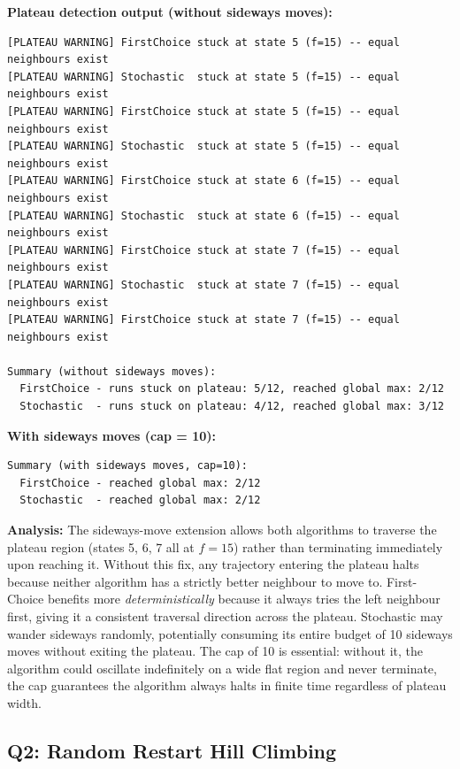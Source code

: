 \documentclass[12pt,a4paper]{article}
\begin{document}
\textbf{Plateau detection output (without sideways moves):}

\begin{lstlisting}[style=output]
[PLATEAU WARNING] FirstChoice stuck at state 5 (f=15) -- equal neighbours exist
[PLATEAU WARNING] Stochastic  stuck at state 5 (f=15) -- equal neighbours exist
[PLATEAU WARNING] FirstChoice stuck at state 5 (f=15) -- equal neighbours exist
[PLATEAU WARNING] Stochastic  stuck at state 5 (f=15) -- equal neighbours exist
[PLATEAU WARNING] FirstChoice stuck at state 6 (f=15) -- equal neighbours exist
[PLATEAU WARNING] Stochastic  stuck at state 6 (f=15) -- equal neighbours exist
[PLATEAU WARNING] FirstChoice stuck at state 7 (f=15) -- equal neighbours exist
[PLATEAU WARNING] Stochastic  stuck at state 7 (f=15) -- equal neighbours exist
[PLATEAU WARNING] FirstChoice stuck at state 7 (f=15) -- equal neighbours exist

Summary (without sideways moves):
  FirstChoice - runs stuck on plateau: 5/12, reached global max: 2/12
  Stochastic  - runs stuck on plateau: 4/12, reached global max: 3/12
\end{lstlisting}

\textbf{With sideways moves (cap = 10):}

\begin{lstlisting}[style=output]
Summary (with sideways moves, cap=10):
  FirstChoice - reached global max: 2/12
  Stochastic  - reached global max: 2/12
\end{lstlisting}

\textbf{Analysis:}
The sideways-move extension allows both algorithms to traverse the plateau
region (states 5, 6, 7 all at $f=15$) rather than terminating immediately upon
reaching it. Without this fix, any trajectory entering the plateau halts because
neither algorithm has a strictly better neighbour to move to.
First-Choice benefits more \emph{deterministically} because it always tries the
left neighbour first, giving it a consistent traversal direction across the plateau.
Stochastic may wander sideways randomly, potentially consuming its entire budget
of 10 sideways moves without exiting the plateau.
The cap of 10 is essential: without it, the algorithm could oscillate indefinitely
on a wide flat region and never terminate, the cap guarantees the algorithm
always halts in finite time regardless of plateau width.

\subsection{Q2: Random Restart Hill Climbing}
\end{document}
